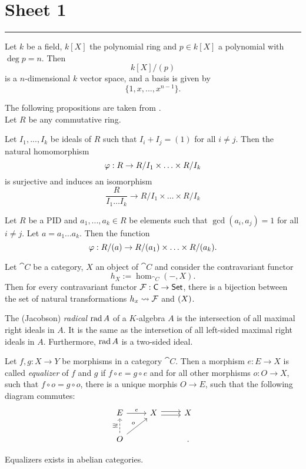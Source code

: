 \section{Sheet 1}

\hrule
\begin{prop}
Let $k$ be a field, $k[X]$ the polynomial ring and $p\in k[X]$ a polynomial with $\deg p=n$. Then
	\[
	k[X]/(p)
	\]
is a $n$-dimensional $k$ vector space, and a basis is given by
	\[
	\{1,x,...,x^{n-1}\}.
	\]
\end{prop}
The following propositions are taken from \cite{aluffi}.\\
Let $R$ be any commutative ring.
\begin{prop}
  Let $I_1,...,I_k$ be ideals of $R$ such that $I_i+I_j=(1)$ for all $i\neq j$. Then the natural homomorphism
  \[
  \varphi :R\to R/I_1\times \hdots \times R/I_k
  \]
  is surjective and induces an isomorphism
  \[
  \frac{R}{I_1\hdots I_k}\to R/I_1\times \hdots \times R/I_k
  \]
\end{prop}
\begin{cor}
  Let $R$ be a PID and $a_1,...,a_k\in R$ be elements such that $\gcd(a_i,a_j)=1$ for all $i\neq j$. Let $a=a_1\hdots a_k$. Then the function
  \[
  \varphi: R/(a)\to R/(a_1)\times \hdots \times R/(a_k).
  \]
\end{cor}
\begin{prop}
	Let $\cat{C}$ be a category, $X$ an object of $\cat{C}$ and consider the contravariant functor
	\[
	h_X:= \hom_{\cat{C}}(-,X).
	\]
	Then for every contravariant functor $\mathcal{F}:\mathsf{C}\to \mathsf{Set}$, there is a bijection between the set of natural transformations $h_x\leadsto\mathcal{F}$ and $\mathcal{(}X)$.
\end{prop}
\begin{defn}
	The (Jacobson) \emph{radical} $\operatorname{rad} A$ of a $K$-algebra $A$ is the intersection of all maximal right ideals in $A$. It is the same as the intersetion of all left-sided maximal right ideals in $A$. Furthermore, $\operatorname{rad} A$ is a two-sided ideal.
\end{defn}

\begin{defn}
	Let $f,g:X\to Y$ be morphisms in a category $\cat{C}$. Then a morphism $e:E\to X$ is called \emph{equalizer} of $f$ and $g$ if $f\circ e=g\circ e$ and for all other morphisms $o:O\to X$, such that $f\circ o=g\circ o$, there is a unique morphis $O\to E$, such that the following diagram commutes:
	\[
	\begin{tikzcd}
		E\ar{r}{e}&X\ar[shift left = .5ex]{r}\ar[shift right = .5ex]{r}&X\\
		O\ar[dashed]{u}{\exists !}\ar{ur}{o}&&.
	\end{tikzcd}
	\]
\end{defn}
\begin{prop}
	Equalizers exists in abelian categories.
\end{prop}  

